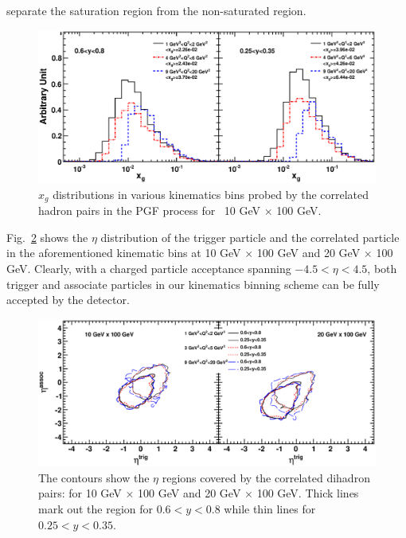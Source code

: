 separate the saturation region from the non-saturated region.
\begin{figure}
\begin{center}
\includegraphics[width=1.0\textwidth]{plots/chpt6/ep_10x100_xg_distribution_multibins.eps} 
\end{center} 
\caption[$x_{g}$ coverage]{$x_{g}$ distributions in various kinematics bins
probed by the correlated hadron pairs in the PGF process for \ep\ 10 GeV
$\times$ 100 GeV. }
\label{fig:xgCover} 
\end{figure}
Fig.~\ref{fig:pairEta} shows the $\eta$ distribution of the trigger
particle and the correlated particle in the aforementioned kinematic
bins at 10 GeV $\times$ 100 GeV and 20 GeV $\times$ 100 GeV. Clearly, with a
charged particle acceptance spanning $-4.5<\eta<4.5$, both trigger and
associate particles in our kinematics binning scheme can be fully accepted by
the detector.
\begin{figure}
\begin{center}
\includegraphics[width=1.0\textwidth]{plots/chpt6/ep_10And20x100_trig_2_asso_1_z_0.2_0.4_multiBin_etaCorre.eps}
\end{center} 
\caption[dihadron pair $\eta$ distribution]{The contours show the
$\eta$ regions covered by the correlated dihadron pairs: for 10 GeV $\times$ 100
GeV and 20 GeV $\times$ 100 GeV. Thick lines mark out the region for $0.6<y<0.8$
while thin lines for $0.25<y<0.35$.}
\label{fig:pairEta} 
\end{figure}


